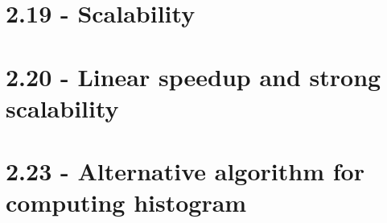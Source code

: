 \documentclass[a4paper,11pt,twoside]{article}
\begin{document}
\section{2.19 - Scalability}
\section{2.20 - Linear speedup and strong scalability}
\section{2.23 - Alternative algorithm for computing histogram}

\end{document}
